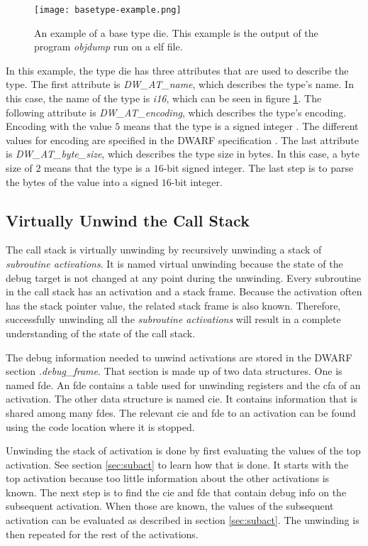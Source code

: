 \begin{figure}[h]
	\centering
	\texttt{[image: basetype-example.png]}
	\caption{An example of a base type \gls{die}. This example is the output of the program \emph{objdump} run on a \gls{elf} file.}
	\label{fig:basetypeexample}
\end{figure}


In this example, the type \gls{die} has three attributes that are used to describe the type.
The first attribute is \emph{DW\_AT\_name}, which describes the type's name.
In this case, the name of the type is \emph{i16}, which can be seen in figure \ref{fig:basetypeexample}.
The following attribute is \emph{DW\_AT\_encoding}, which describes the type's encoding.
Encoding with the value $5$ means that the type is a signed integer \cite{dwarf}.
The different values for encoding are specified in the \gls{DWARF} specification \cite{dwarf}.
The last attribute is \emph{DW\_AT\_byte\_size}, which describes the type size in bytes.
In this case, a byte size of $2$ means that the type is a $16$-bit signed integer.
The last step is to parse the bytes of the value into a signed $16$-bit integer.


\subsection{Virtually Unwind the Call Stack}
\label{sec:stacktrace}
The call stack is virtually unwinding by recursively unwinding a stack of \emph{subroutine activations}.
It is named virtual unwinding because the state of the debug target is not changed at any point during the unwinding.
Every subroutine in the call stack has an activation and a stack frame.
Because the activation often has the stack pointer value, the related stack frame is also known.
Therefore, successfully unwinding all the \emph{subroutine activations} will result in a complete understanding of the state of the call stack.


The debug information needed to unwind activations are stored in the \gls{DWARF} section \emph{.debug\_frame}.
That section is made up of two data structures.
One is named \gls{fde}.
An \gls{fde} contains a table used for unwinding registers and the \gls{cfa} of an activation.
The other data structure is named \gls{cie}.
It contains information that is shared among many \glspl{fde}.
The relevant \gls{cie} and \gls{fde} to an activation can be found using the code location where it is stopped.


Unwinding the stack of activation is done by first evaluating the values of the top activation.
See section \ref{sec:subact} to learn how that is done.
It starts with the top activation because too little information about the other activations is known.
The next step is to find the \gls{cie} and \gls{fde} that contain debug info on the subsequent activation.
When those are known, the values of the subsequent activation can be evaluated as described in section \ref{sec:subact}.
The unwinding is then repeated for the rest of the activations.


